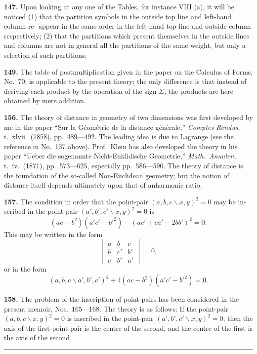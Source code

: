 \documentclass[11pt,a4paper]{article}
\begin{document}
\textbf{147.} Upon looking at any one of the Tables, for instance VIII (a), it will be
noticed (1) that the partition symbols in the outside top line and left-hand column re-
appear in the same order in the left-hand top line and outside column respectively;
(2) that the partitions which present themselves in the outside lines and columns are
not in general all the partitions of the same weight, but only a selection of such
partitions.

\textbf{149.} The table of postmultiplication given in the paper on the Calculus of Forms,
No.~70, is applicable to the present theory; the only difference is that instead of
deriving each product by the operation of the sign $\Sigma$, the products are here obtained
by mere addition.

\textbf{156.} The theory of distance in geometry of two dimensions was first developed
by me in the paper ``Sur la G\'{e}om\'{e}trie de la distance g\'{e}n\'{e}rale,'' \textit{Comptes Rendus},
t.~xlvii.\ (1858), pp.~489---492. The leading idea is due to Lagrange (see the reference
in No.~137 above). Prof.\ Klein has also developed the theory in his paper ``Ueber die
sogenannte Nicht-Euklidische Geometrie,'' \textit{Math.\ Annalen}, t.\ iv.\ (1871), pp.~573---625,
especially pp.~586---590. The theory of distance is the foundation of the so-called
Non-Euclidean geometry; but the notion of distance itself depends ultimately upon that
of anharmonic ratio.

\textbf{157.} The condition in order that the point-pair $(a,b,c\!\backslash x,y)^2=0$ may be in-
scribed in the point-pair $(a',b',c'\!\backslash x,y)^2=0$ is
\[
(ac-b^2)(a'c'-b'^2)-(ac'+ca'-2bb')^2=0.
\]
This may be written in the form
\[
\begin{vmatrix}
a & b & c \\
b & c' & b' \\
c & b' & a'
\end{vmatrix} = 0,
\]
or in the form
\[
(a,b,c\!\backslash a',b',c')^2 + 4(ac-b^2)(a'c'-b'^2) = 0.
\]

\textbf{158.} The problem of the inscription of point-pairs has been considered in the
present memoir, Nos.~165---168. The theory is as follows: If the point-pair
$(a,b,c\!\backslash x,y)^2=0$ is inscribed in the point-pair $(a',b',c'\!\backslash x,y)^2=0$, then the axis of the
first point-pair is the centre of the second, and the centre of the first is the axis of the
second.

\vspace{2em}
\begin{center}
\rule{0.5\textwidth}{0.4pt}
\end{center}
\end{document}
